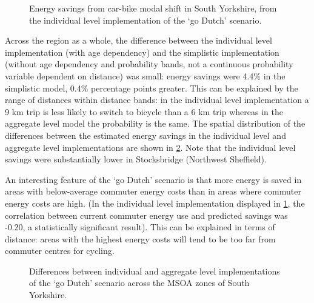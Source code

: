 \begin{figure}
 \caption[Energy savings from car-bike modal shift in South Yorkshire]
 {Energy savings from car-bike modal shift in South Yorkshire, from the
 individual level implementation of the `go Dutch' scenario.} \label{fbikeage}
\end{figure}

Across the region as a whole, the difference between the individual level
implementation (with age dependency) and the simplistic implementation
(without age dependency and probability bands, not a continuous probability
variable dependent on distance) was small: energy savings were 4.4\% in the
simplistic model, 0.4\% percentage points greater. This can be explained by the
range of distances within distance bands: in the individual level implementation
a 9 km trip is less likely to switch to bicycle than a 6 km trip whereas
in the aggregate level model the probability is the same. The spatial distribution
of the differences between the estimated energy savings in the individual level
and aggregate level implementations are shown in \cref{fcydif}. Note that the
individual level savings were substantially lower in Stocksbridge (Northwest
Sheffield).

An interesting feature of the `go Dutch' scenario is that more energy is
saved in areas with below-average commuter energy costs than in areas where
commuter energy costs are high. (In the individual level implementation
displayed in \cref{fbikeage}, the correlation between current commuter energy use
and predicted savings was -0.20, a statistically significant result).
This can be explained in terms of distance:
areas with the highest energy costs will tend to be too far from
commuter centres for cycling.

\begin{figure}
 \caption[Differences between individual and aggregate level implementations]
 {Differences between individual and aggregate level implementations of the
 `go Dutch' scenario across the MSOA zones of South Yorkshire.} \label{fcydif}
\end{figure}

